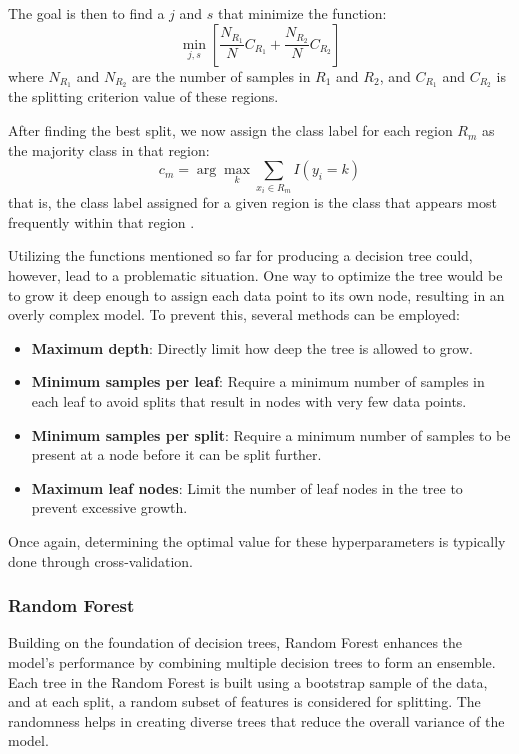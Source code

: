 \documentclass[english,11pt,a4paper,titlepage]{article}
\begin{document}
	The goal is then to find a \( j \) and \( s \) that minimize the function:
	\begin{equation*}
		\min_{j,s} \left[\frac{N_{R_1}}{N}C_{R_1} + \frac{N_{R_2}}{N}C_{R_2}\right]
	\end{equation*}
	where \( N_{R_1} \) and \( N_{R_2} \) are the number of samples in \( R_1 \) and \( R_2 \), and \( C_{R_1} \) and \( C_{R_2} \) is the splitting criterion value of these regions.
	
	After finding the best split, we now assign the class label for each region \( R_m \) as the majority class in that region:
	\begin{equation*}
		c_m = \arg \max_k \sum_{x_i \in R_m} I(y_i = k)
	\end{equation*}
	that is, the class label assigned for a given region is the class that appears most frequently within that region \cite{hastieElementsStatisticalLearning2009,sohilIntroductionStatisticalLearning2022}.
	
	Utilizing the functions mentioned so far for producing a decision tree could, however, lead to a problematic situation. One way to optimize the tree would be to grow it deep enough to assign each data point to its own node, resulting in an overly complex model. To prevent this, several methods can be employed:
	\begin{itemize}
		\item \textbf{Maximum depth}: Directly limit how deep the tree is allowed to grow.
		\item \textbf{Minimum samples per leaf}: Require a minimum number of samples in each leaf to avoid splits that result in nodes with very few data points.
		\item \textbf{Minimum samples per split}: Require a minimum number of samples to be present at a node before it can be split further.
		\item \textbf{Maximum leaf nodes}: Limit the number of leaf nodes in the tree to prevent excessive growth.
	\end{itemize}
	
	Once again, determining the optimal value for these hyperparameters is typically done through cross-validation.
	
	\subsubsection*{Random Forest}
	Building on the foundation of decision trees, Random Forest enhances the model's performance by combining multiple decision trees to form an ensemble. Each tree in the Random Forest is built using a bootstrap sample of the data, and at each split, a random subset of features is considered for splitting. The randomness helps in creating diverse trees that reduce the overall variance of the model.
	
\end{document}
